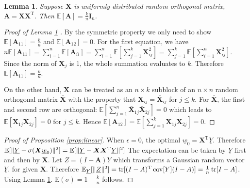 \documentclass[conference]{IEEEtran}
\newtheorem{lemma}{Lemma}
\DeclarePairedDelimiter\norm{\lVert}{\rVert}
\def\E{\mathbb{E}}
\def\T{\mathrm{T}}
\DeclareMathOperator*{\Tr}{tr}
\DeclareMathOperator*{\Cov}{cov}
\begin{document}
\appendix
\begin{lemma}\label{lem:A}
	Suppose $\bm{X}$ is uniformly distributed random orthogonal matrix, $\bm{A} = \bm{X}\bm{X}^\T$.
	Then $\E[\bm{A}] = \frac{k}{n} \mathbf{I}_n$.
\end{lemma}
\begin{proof}[Proof of Lemma \ref{lem:A} ]
By the symmetric property we only need to show $\E[\bm{A}_{11}] = \frac{k}{n}$ and
$\E[\bm{A}_{12}] = 0$. For the first equation, we have $n\E[\bm{A}_{11}]
= \sum_{i=1}^n \E[\bm{A}_{ii}] = \sum_{i=1}^n \E[ \sum_{j=1}^k \bm{X}^2_{ij}] =
\sum_{j=1}^k \E[\sum_{i=1}^n \bm{X}^2_{ij}]$. Since the norm of $\bm{X}_j$ is 1,
the whole summation evaluates to $k$. Therefore $\E[\bm{A}_{11}] = \frac{k}{n}$.

On the other hand, $\bm{X}$ can be treated as an $n\times k$ subblock of an $n\times n$
random orthogonal matrix $\bm{\bar{X}}$ with the property that $\bm{X}_{ij} = \bm{\bar{X}}_{ij}$
for $j\leq k$. For $\bm{\bar{X}}$, the first and second row are orthogonal:
 $\E[\sum_{j=1}^n \bm{\bar{X}}_{1j}\bm{\bar{X}}_{2j}] = 0 $ which leads to
 $\E[\bm{X}_{1j}\bm{X}_{2j}] = 0$ for $j \leq k$. Hence $\E[\bm{A}_{12}]=
 \E[\sum_{j=1}^k \bm{X}_{1j}\bm{X}_{2j}]=0$.
\end{proof}
\begin{proof}[Proof of Proposition \ref{prop:linear}]
    When $\epsilon = 0$, the optimal $\underline{w}_0 = \bm{X}^\T\underline{Y}$. Therefore
    $\E[\norm{\underline{Y} - \sigma(\bm{X} \underline{w}_0)}^2] = \E[\norm{\underline{Y}-\bm{X}\bm{X}^\T\underline{Y}}^2]$
    The expectation can be taken by $\underline{Y}$ first and then by $\bm{X}$.
    Let $\underline{Z} = (I-\bm{A}) \underline{Y}$ which transforms a Gaussian random vector $\underline{Y}$.
    for given $\bm{X}$. Therefore $\E_{\underline{Y}}[\norm{\underline{Z}}^2] = \Tr[(I-A)^\T\Cov[Y](I-A)]
    = \frac{1}{n}\Tr[I - A]$. Using Lemma \ref{lem:A}. $\mathrm{E}(\sigma) = 1 - \frac{k}{n}$ follows.
\end{proof}
\end{document}
